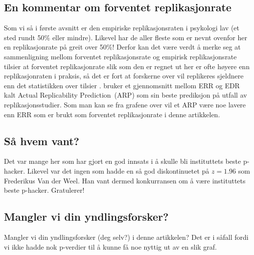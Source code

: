 \documentclass[doc,norsk]{apa7}
\begin{document}
\subsection{En kommentar om forventet replikasjonrate}
Som vi så i første avsnitt er den empiriske replikasjonsraten i psykologi lav (et sted rundt 50\% eller mindre). Likevel har de aller fleste som er nevnt ovenfor her en replikasjonrate på greit over 50\%! Derfor kan det være verdt å merke seg at sammenligning mellom forventet replikasjonsrate og empirisk replikasjonsrate tilsier at forventet replikasjonrate slik som den er regnet ut her er ofte høyere enn replikasjonraten i praksis, så det er fort at forskerne over vil replikeres sjeldnere enn det statistikken over tilsier \parencite{z-curve-implementasjon, z-curve-mot-empiri}. \textcite{arp} bruker et gjennomsnitt mellom ERR og EDR kalt \guillemetleft Actual Replicability Prediction\guillemetright\ (ARP) som sin beste prediksjon på utfall av replikasjonsstudier. Som man kan se fra grafene over vil et ARP være noe lavere enn ERR som er brukt som forventet replikasjonrate i denne artikkelen.

\subsection{Så hvem vant?}
Det var mange her som har gjort en god innsats i å skulle bli instituttets beste p-hacker. Likevel var det ingen som hadde en så god diskontinuetet på $z=1.96$ som Frederikus Van der Weel. Han vant dermed konkurransen om å være instituttets beste p-hacker. Gratulerer!

\subsection{Mangler vi din yndlingsforsker?}

Mangler vi din yndlingsforsker (deg selv?) i denne artikkelen? Det er i såfall fordi vi ikke hadde nok p-verdier til å kunne få noe nyttig ut av en slik graf.
\end{document}
